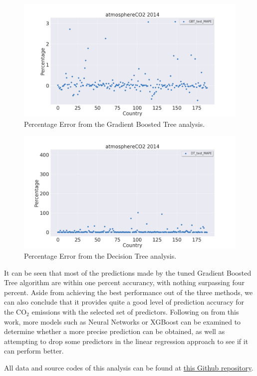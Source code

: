 \documentclass[11pt,a4paper,titlepage]{article}
\begin{document}
\begin{figure}[!htbp]
    \begin{center}
        \includegraphics[width=\textwidth]{../Plots/atmosphereCO2_test_GBT_MAPE.png}
        \caption{Percentage Error from the Gradient Boosted Tree analysis.}
        \label{fig:atmosphereCO2_test_GBT_MAPE}
    \end{center}
\end{figure}

\begin{figure}[!htbp]
    \begin{center}
        \includegraphics[width=\textwidth]{../Plots/atmosphereCO2_test_DT_MAPE.png}
        \caption{Percentage Error from the Decision Tree analysis.}
        \label{fig:atmosphereCO2_test_DT_MAPE}
    \end{center}
\end{figure}

It can be seen that most of the predictions made by the tuned Gradient Boosted Tree algorithm are within one percent accurancy, with nothing surpassing four percent. Aside from achieving the best performance out of the three methods, we can also conclude that it provides quite a good level of prediction accuracy for the CO$_{2}$ emissions with the selected set of predictors. Following on from this work, more models such as Neural Networks or XGBoost can be examined to determine whether a more precise prediction can be obtained, as well as attempting to drop some predictors in the linear regression approach to see if it can perform better.

All data and source codes of this analysis can be found at \href{https://github.com/jasonyctam/WorldBankClimateChange}{this Github repository}.
\end{document}
